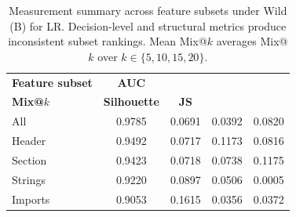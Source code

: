\begin{table}[t]
\centering
\caption{Measurement summary across feature subsets under Wild (B) for LR.
Decision-level and structural metrics produce inconsistent subset rankings.
Mean Mix@$k$ averages Mix@$k$ over $k \in \{5,10,15,20\}$.}
\label{tab:measurement_summary}
\scriptsize
\setlength{\tabcolsep}{4pt}
\begin{tabular}{@{}lcccc@{}}
\toprule
\textbf{Feature subset}
& \textbf{AUC}
& \makecell{\textbf{Mean}\\\textbf{Mix@$k$}}
& \textbf{Silhouette}
& \textbf{JS} \\
\midrule
All     & 0.9785 & 0.0691 & 0.0392 & 0.0820 \\
Header  & 0.9492 & 0.0717 & 0.1173 & 0.0816 \\
Section & 0.9423 & 0.0718 & 0.0738 & 0.1175 \\
Strings & 0.9220 & 0.0897 & 0.0506 & 0.0005 \\
Imports & 0.9053 & 0.1615 & 0.0356 & 0.0372 \\
\bottomrule
\end{tabular}
\end{table}
